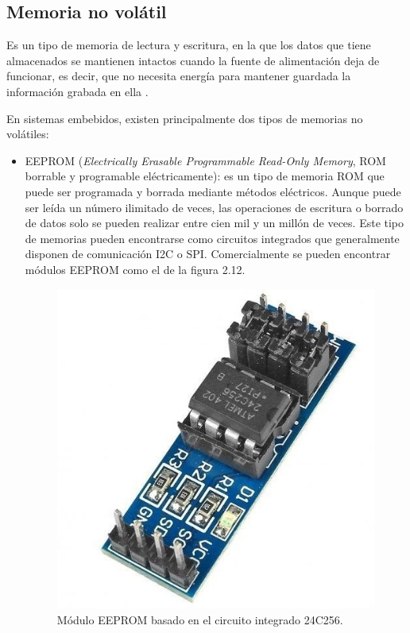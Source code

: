 \subsection{Memoria no volátil}

Es un tipo de memoria de lectura y escritura, en la que los datos que tiene almacenados se mantienen intactos cuando la fuente de alimentación deja de funcionar, es decir, que no necesita energía para mantener guardada la información grabada en ella \citep{BOOK:3}.

En sistemas embebidos, existen principalmente dos tipos de memorias no volátiles:

\begin{itemize}
	\item EEPROM (\textit{Electrically Erasable Programmable Read-Only Memory}, ROM borrable y programable eléctricamente): es un tipo de memoria ROM que puede ser programada y borrada mediante métodos eléctricos. Aunque puede ser leída un número ilimitado de veces, las operaciones de escritura o borrado de datos solo se pueden realizar entre cien mil y un millón de veces. Este tipo de memorias pueden encontrarse como circuitos integrados que generalmente disponen de comunicación I2C o SPI. Comercialmente se pueden encontrar módulos EEPROM como el de la figura 2.12.
	\begin{figure}[h]
		\centering
		\includegraphics[scale=0.29]{./Figures/eeprom.jpg}
		\caption{Módulo EEPROM basado en el circuito integrado 24C256\protect\footnotemark.}
		\label{fig:cuadradoAzul}
	\end{figure}


\end{itemize}
